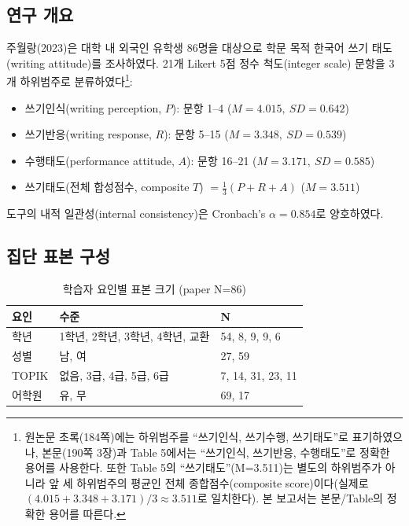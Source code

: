 \documentclass[11pt]{article}
\begin{document}
\subsection{연구 개요}
주월랑(2023)은 대학 내 외국인 유학생 86명을 대상으로 학문 목적 한국어 쓰기 태도(writing attitude)를 조사하였다. 21개 Likert 5점 정수 척도(integer scale) 문항을 3개 하위범주로 분류하였다\footnote{원논문 초록(184쪽)에는 하위범주를 ``쓰기인식, 쓰기수행, 쓰기태도''로 표기하였으나, 본문(190쪽 3장)과 Table 5에서는 ``쓰기인식, 쓰기반응, 수행태도''로 정확한 용어를 사용한다. 또한 Table 5의 ``쓰기태도''(M=3.511)는 별도의 하위범주가 아니라 앞 세 하위범주의 평균인 전체 종합점수(composite score)이다(실제로 $(4.015+3.348+3.171)/3 \approx 3.511$로 일치한다). 본 보고서는 본문/Table의 정확한 용어를 따른다.}:
\begin{itemize}
\item 쓰기인식(writing perception, $P$): 문항 1--4 ($M=4.015,\ SD=0.642$)
\item 쓰기반응(writing response, $R$): 문항 5--15 ($M=3.348,\ SD=0.539$)
\item 수행태도(performance attitude, $A$): 문항 16--21 ($M=3.171,\ SD=0.585$)
\item 쓰기태도(전체 합성점수, composite $T$) $= \tfrac{1}{3}(P+R+A)$ ($M=3.511$)
\end{itemize}
도구의 내적 일관성(internal consistency)은 Cronbach's $\alpha=0.854$로 양호하였다.

\subsection{집단 표본 구성}
\begin{table}[h]
\centering
\caption{학습자 요인별 표본 크기 (paper N=86)}
\begin{tabular}{lll}
\toprule
요인 & 수준 & N \\
\midrule
학년 & 1학년, 2학년, 3학년, 4학년, 교환 & 54, 8, 9, 9, 6 \\
성별 & 남, 여 & 27, 59 \\
TOPIK & 없음, 3급, 4급, 5급, 6급 & 7, 14, 31, 23, 11 \\
어학원 & 유, 무 & 69, 17 \\
\bottomrule
\end{tabular}
\end{table}
\end{document}
